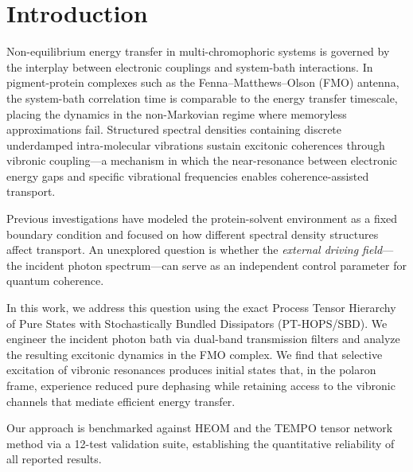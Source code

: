 \documentclass[aip,jcp,preprint]{revtex4-2}
\begin{document}
\maketitle

\section{\label{sec:intro}Introduction}

Non-equilibrium energy transfer in multi-chromophoric systems is governed by the interplay between electronic couplings and system-bath interactions.\cite{Scholes2011,Cao2020} In pigment-protein complexes such as the Fenna--Matthews--Olson (FMO) antenna,\cite{Adolphs2006} the system-bath correlation time is comparable to the energy transfer timescale, placing the dynamics in the non-Markovian regime where memoryless approximations fail.\cite{Tanimura1989,Engel2007,Panitchayangkoon2010} Structured spectral densities containing discrete underdamped intra-molecular vibrations sustain excitonic coherences through vibronic coupling---a mechanism in which the near-resonance between electronic energy gaps and specific vibrational frequencies enables coherence-assisted transport.\cite{Ishizaki2009a,Christensson2012,Chin2013}

Previous investigations have modeled the protein-solvent environment as a fixed boundary condition and focused on how different spectral density structures affect transport.\cite{Huelga2013,Cao2020} An unexplored question is whether the \textit{external driving field}---the incident photon spectrum---can serve as an independent control parameter for quantum coherence.

In this work, we address this question using the exact Process Tensor Hierarchy of Pure States with Stochastically Bundled Dissipators (PT-HOPS/SBD).\cite{Suess2014,Citty2024a} We engineer the incident photon bath via dual-band transmission filters and analyze the resulting excitonic dynamics in the FMO complex. We find that selective excitation of vibronic resonances produces initial states that, in the polaron frame,\cite{Jang2008} experience reduced pure dephasing while retaining access to the vibronic channels that mediate efficient energy transfer.

Our approach is benchmarked against HEOM\cite{Tanimura1989,Ishizaki2009a} and the TEMPO tensor network method\cite{Strathearn2018} via a 12-test validation suite, establishing the quantitative reliability of all reported results.
\end{document}

